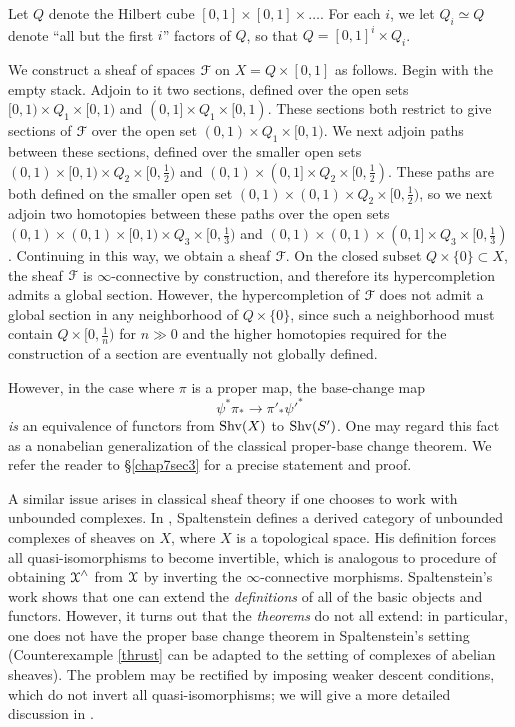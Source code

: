 \begin{itemize}
\begin{counterexample}\label{thrust}
Let $Q$ denote the Hilbert cube $[0,1] \times [0,1] \times
\ldots$. For each $i$, we let $Q_i \simeq Q$ denote ``all but the
first $i$'' factors of $Q$, so that $Q = [0,1]^i \times Q_i$.

We construct a sheaf of spaces $\operatorname{\mathcal{F}}$ on $X = Q \times [0,1]$ as follows.
Begin with the empty stack. Adjoin to it two sections, defined
over the open sets $[0,1) \times Q_1 \times [0,1)$ and $(0,1]
\times Q_1 \times [0,1)$. These sections both restrict to give
sections of $\operatorname{\mathcal{F}}$ over the open set $(0,1) \times Q_1 \times
[0,1)$. We next adjoin paths between these sections, defined over
the smaller open sets $(0,1) \times [0,1) \times Q_2 \times
[0,\frac{1}{2})$ and $(0,1) \times (0,1] \times Q_2 \times [0,
\frac{1}{2})$. These paths are both defined on the smaller open
set $(0,1) \times (0,1) \times Q_2 \times [0, \frac{1}{2})$, so we
next adjoin two homotopies between these paths over the open sets
$(0,1) \times (0,1) \times [0,1) \times Q_3 \times [0,
\frac{1}{3})$ and $(0,1) \times (0,1) \times (0,1] \times Q_3
\times [0, \frac{1}{3})$. Continuing in this way, we obtain a
sheaf $\operatorname{\mathcal{F}}$. On the closed subset $Q \times \{0\} \subset X$,
the sheaf $\operatorname{\mathcal{F}}$ is $\infty$-connective by construction, and
therefore its hypercompletion admits a global section.
However, the hypercompletion of $\operatorname{\mathcal{F}}$ does not admit a
global section in any neighborhood of $Q \times \{0\}$, since such
a neighborhood must contain $Q \times [ 0, \frac{1}{n})$ for $n
\gg 0$ and the higher homotopies required for the construction of
a section are eventually not globally defined.
\end{counterexample}

However, in the case where $\pi$ is a proper map, the base-change map
$$\psi^{\ast} \pi_{\ast} \rightarrow \pi'_{\ast} \psi'^{\ast}$$
{\em is} an equivalence of functors from $\operatorname{Shv}(X)$ to $\operatorname{Shv}(S')$. One may regard this
fact as a nonabelian generalization of the classical proper-base change theorem.
We refer the reader to \S \ref{chap7sec3} for a precise statement and proof.

\begin{remark}
A similar issue arises in classical sheaf theory if one chooses to
work with unbounded complexes. In \cite{spaltenstein},
Spaltenstein defines a derived category of unbounded complexes of
sheaves on $X$, where $X$ is a topological space. His definition
forces all quasi-isomorphisms to become invertible, which is
analogous to procedure of obtaining $\operatorname{\mathcal{X}}^{\wedge}$ from $\operatorname{\mathcal{X}}$ by
inverting the $\infty$-connective morphisms. Spaltenstein's work
shows that one can extend the {\it definitions} of all of the
basic objects and functors. However, it turns out that the {\it
theorems} do not all extend: in particular, one does not have the
proper base change theorem in Spaltenstein's setting
(Counterexample \ref{thrust} can be adapted to the setting
of complexes of abelian sheaves). The problem may be rectified by
imposing weaker descent conditions, which do not invert all
quasi-isomorphisms; we will give a more detailed discussion in \cite{DAG}.
\end{remark}


\end{itemize}
